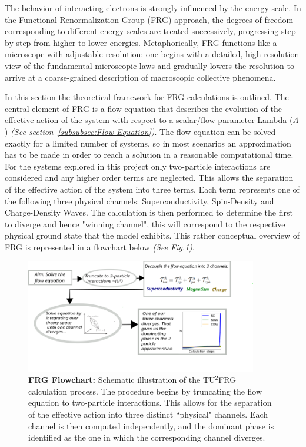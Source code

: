 \documentclass[12pt]{article}
\begin{document}
\medskip

\noindent The behavior of interacting electrons is strongly influenced by the energy scale. In the Functional Renormalization Group (FRG) approach, the degrees of freedom corresponding to different energy scales are treated successively, 
progressing step-by-step from higher to lower energies.
Metaphorically, FRG functions like a microscope with adjustable resolution: one begins with a detailed, high-resolution view of the fundamental microscopic laws and gradually lowers the resolution to arrive at a coarse-grained description of macroscopic collective phenomena.
\medskip

\noindent In this section the theoretical framework for FRG calculations is outlined. The central element of FRG is a flow equation that describes the evolution of the effective action of the system with respect to a scalar/flow parameter Lambda ($\Lambda$) \textit{(See section~\ref{subsubsec:Flow Equation})}.
The flow equation can be solved exactly for a limited number of systems, so in most scenarios an approximation has to be made in order to reach a solution in a reasonable computational time.  
For the systems explored in this project only two-particle
interactions are considered and any higher order terms are neglected.
This allows the separation of the effective action of the system into three terms. Each term represents one of the following three physical channels: Superconductivity, Spin-Density and Charge-Density Waves.
The calculation is then performed to determine the first to diverge and hence "winning channel", this will correspond to the respective physical ground state that the model exhibits. This rather conceptual overview of FRG is represented in a flowchart below \textit{(See Fig.\ref{fig:FRGflowdiagram})}.
 

\begin{figure}[htbp]  %
    \centering
    \includegraphics[width=0.9\textwidth]{FRGflowdiagram.png}  %
    \caption{\textbf{FRG Flowchart:} Schematic illustration of the TU$^2$FRG calculation process.
     The procedure begins by truncating the flow equation to two-particle interactions. 
     This allows for the separation of the effective action into three distinct ``physical" channels. 
     Each channel is then computed independently, and the dominant phase is identified as the 
     one in which the corresponding channel diverges.}
    \label{fig:FRGflowdiagram}
\end{figure}
\end{document}
